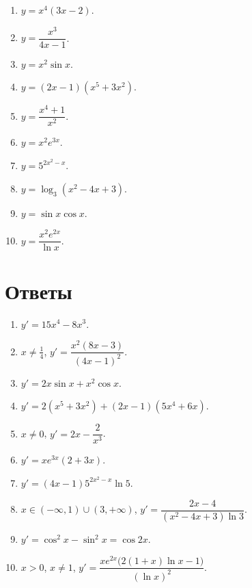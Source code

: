 \documentclass[a4paper,12pt]{article}
\newcommand{\sectionline}{\vspace{0.25em}{\color{accent}\rule{\linewidth}{0.8pt}}\vspace{0.45em}}
\begin{document}
\begin{enumerate}[label=\textbf{\arabic*)}]
\item $y=x^4(3x-2)$.
\item $y=\dfrac{x^3}{4x-1}$.
\item $y=x^2\sin x$.
\item $y=(2x-1)(x^5+3x^2)$.
\item $y=\dfrac{x^4+1}{x^2}$.
\item $y=x^2e^{3x}$.
\item $y=5^{2x^2-x}$.
\item $y=\log_3(x^2-4x+3)$.
\item $y=\sin x\cos x$.
\item $y=\dfrac{x^2e^{2x}}{\ln x}$.
\end{enumerate}

\clearpage
\section*{\color{darkaccent}Ответы}
\sectionline

\begin{enumerate}[label=\textbf{\arabic*)}]
\item $y'=15x^4-8x^3$.
\item $x\ne\frac14$, \quad $y'=\dfrac{x^2(8x-3)}{(4x-1)^2}$.
\item $y'=2x\sin x+x^2\cos x$.
\item $y'=2(x^5+3x^2)+(2x-1)(5x^4+6x)$.
\item $x\ne0$, \quad $y'=2x-\dfrac2{x^3}$.
\item $y'=xe^{3x}(2+3x)$.
\item $y'=(4x-1)5^{2x^2-x}\ln5$.
\item $x\in(-\infty,1)\cup(3,+\infty)$, \quad $y'=\dfrac{2x-4}{(x^2-4x+3)\ln3}$.
\item $y'=\cos^2x-\sin^2x=\cos2x$.
\item $x>0$, $x\ne1$, \quad $y'=\dfrac{xe^{2x}\bigl(2(1+x)\ln x-1\bigr)}{(\ln x)^2}$.
\end{enumerate}
\end{document}
